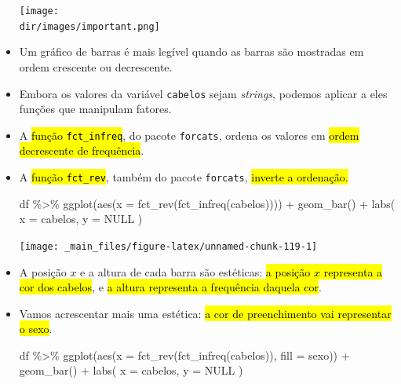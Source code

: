 \documentclass[
  11pt]{report}
\newenvironment{Shaded}{\begin{snugshade}}{\end{snugshade}}
\newcommand{\AttributeTok}[1]{\textcolor[rgb]{0.77,0.63,0.00}{#1}}
\newcommand{\ConstantTok}[1]{\textcolor[rgb]{0.00,0.00,0.00}{#1}}
\newcommand{\FunctionTok}[1]{\textcolor[rgb]{0.00,0.00,0.00}{#1}}
\newcommand{\NormalTok}[1]{#1}
\newcommand{\SpecialCharTok}[1]{\textcolor[rgb]{0.00,0.00,0.00}{#1}}
\newcommand{\StringTok}[1]{\textcolor[rgb]{0.31,0.60,0.02}{#1}}
\newcommand{\dir}{/ssd/R/x86_64-pc-linux-gnu-library/4.1/fnaufelRmd/rmarkdown/resources}
\newenvironment{rmdimportant}
{
  \begin{myimportant}
    \texttt{[image: \\dir/images/important.png]}
    \tcblower
  }
  {
  \end{myimportant}
}
\renewenvironment{Shaded}{
    \begin{mdframed}[%
      roundcorner=2pt,%
      innerleftmargin=5pt,%
      innerrightmargin=5pt,%
      topline=true,%
      leftline=true,%
      rightline=true,%
      bottomline=true,%
      linewidth=0.5pt,%
      linecolor=black!20,%
      backgroundcolor=black!2,%
      skipabove=2ex,%
      skipbelow=2.5ex%
    ]%
  }
  {
    \end{mdframed}
  }
\begin{document}
\begin{itemize}
\begin{rmdimportant}
  \end{rmdimportant}
\item
  Um gráfico de barras é mais legível quando as barras são mostradas em ordem crescente ou decrescente.
\item
  Embora os valores da variável \texttt{cabelos} sejam \emph{strings}, podemos aplicar a eles funções que manipulam fatores.
\item
  A {\hl{função {\mbox{\texttt{fct\_infreq}}}}}, do pacote \texttt{forcats}, ordena os valores em {\hl{ordem decrescente de frequência}}.
\item
  A {\hl{função {\mbox{\texttt{fct\_rev}}}}}, também do pacote \texttt{forcats}, {\hl{inverte a ordenação.}}

\begin{Shaded}
\begin{Highlighting}[]
\NormalTok{df }\SpecialCharTok{\%\textgreater{}\%} 
  \FunctionTok{ggplot}\NormalTok{(}\FunctionTok{aes}\NormalTok{(}\AttributeTok{x =} \FunctionTok{fct\_rev}\NormalTok{(}\FunctionTok{fct\_infreq}\NormalTok{(cabelos)))) }\SpecialCharTok{+}
    \FunctionTok{geom\_bar}\NormalTok{() }\SpecialCharTok{+}
    \FunctionTok{labs}\NormalTok{(}
      \AttributeTok{x =} \StringTok{\textquotesingle{}cabelos\textquotesingle{}}\NormalTok{,}
      \AttributeTok{y =} \ConstantTok{NULL}
\NormalTok{    )}
\end{Highlighting}
\end{Shaded}

  \begin{center}\texttt{[image: \_main\_files/figure-latex/unnamed-chunk-119-1]} \end{center}
\item
  A posição $x$ e a altura de cada barra são estéticas: {\hl{a posição $x$ representa a cor dos cabelos}}, e {\hl{a altura representa a frequência daquela cor}}.
\item
  Vamos acrescentar mais uma estética: {\hl{a cor de preenchimento vai representar o sexo}}.

\begin{Shaded}
\begin{Highlighting}[]
\NormalTok{df }\SpecialCharTok{\%\textgreater{}\%} 
  \FunctionTok{ggplot}\NormalTok{(}\FunctionTok{aes}\NormalTok{(}\AttributeTok{x =} \FunctionTok{fct\_rev}\NormalTok{(}\FunctionTok{fct\_infreq}\NormalTok{(cabelos)), }\AttributeTok{fill =}\NormalTok{ sexo)) }\SpecialCharTok{+}
    \FunctionTok{geom\_bar}\NormalTok{() }\SpecialCharTok{+}
    \FunctionTok{labs}\NormalTok{(}
      \AttributeTok{x =} \StringTok{\textquotesingle{}cabelos\textquotesingle{}}\NormalTok{,}
      \AttributeTok{y =} \ConstantTok{NULL}
\NormalTok{    )}
\end{Highlighting}
\end{Shaded}


\end{itemize}
\end{document}
